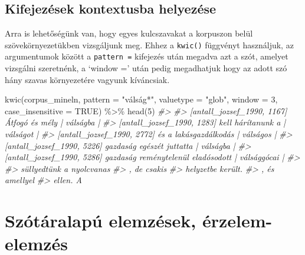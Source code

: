 \documentclass[
]{book}
\newenvironment{Shaded}{\begin{snugshade}}{\end{snugshade}}
\newcommand{\AttributeTok}[1]{\textcolor[rgb]{0.77,0.63,0.00}{#1}}
\newcommand{\CommentTok}[1]{\textcolor[rgb]{0.56,0.35,0.01}{\textit{#1}}}
\newcommand{\ConstantTok}[1]{\textcolor[rgb]{0.00,0.00,0.00}{#1}}
\newcommand{\DecValTok}[1]{\textcolor[rgb]{0.00,0.00,0.81}{#1}}
\newcommand{\FunctionTok}[1]{\textcolor[rgb]{0.00,0.00,0.00}{#1}}
\newcommand{\NormalTok}[1]{#1}
\newcommand{\SpecialCharTok}[1]{\textcolor[rgb]{0.00,0.00,0.00}{#1}}
\newcommand{\StringTok}[1]{\textcolor[rgb]{0.31,0.60,0.02}{#1}}
\begin{document}
\hypertarget{kifejezuxe9sek-kontextusba-helyezuxe9se}{%
\section{Kifejezések kontextusba
helyezése}\label{kifejezuxe9sek-kontextusba-helyezuxe9se}}

Arra is lehetőségünk van, hogy egyes kulcszavakat a korpuszon belül
szövekörnyezetükben vizsgáljunk meg. Ehhez a \texttt{kwic()} függvényt
használjuk, az argumentumok között a \texttt{pattern\ =} kifejezés után
megadva azt a szót, amelyet vizsgálni szeretnénk, a `window =' után
pedig megadhatjuk hogy az adott szó hány szavas környezetére vagyunk
kíváncsiak.

\begin{Shaded}
\begin{Highlighting}[]

\FunctionTok{kwic}\NormalTok{(corpus\_mineln, }\AttributeTok{pattern =} \StringTok{"válság*"}\NormalTok{, }\AttributeTok{valuetype =} \StringTok{"glob"}\NormalTok{, }\AttributeTok{window =} \DecValTok{3}\NormalTok{, }\AttributeTok{case\_insensitive =} \ConstantTok{TRUE}\NormalTok{) }\SpecialCharTok{\%\textgreater{}\%}
  \FunctionTok{head}\NormalTok{(}\DecValTok{5}\NormalTok{)}
\CommentTok{\#\textgreater{}                                                                               }
\CommentTok{\#\textgreater{}  [antall\_jozsef\_1990, 1167]                     Átfogó és mély |  válságba   |}
\CommentTok{\#\textgreater{}  [antall\_jozsef\_1990, 1283]                  kell hárítanunk a |  válságot   |}
\CommentTok{\#\textgreater{}  [antall\_jozsef\_1990, 2772]              és a lakásgazdálkodás |  válságos   |}
\CommentTok{\#\textgreater{}  [antall\_jozsef\_1990, 5226]          gazdaság egészét juttatta |  válságba   |}
\CommentTok{\#\textgreater{}  [antall\_jozsef\_1990, 5286] gazdaság reménytelenül eladósodott | válsággócai |}
\CommentTok{\#\textgreater{}                          }
\CommentTok{\#\textgreater{}  süllyedtünk a nyolcvanas}
\CommentTok{\#\textgreater{}  , de csakis             }
\CommentTok{\#\textgreater{}  helyzetbe került.       }
\CommentTok{\#\textgreater{}  , és amellyel           }
\CommentTok{\#\textgreater{}  ellen. A}
\end{Highlighting}
\end{Shaded}

\hypertarget{szuxf3tuxe1ralapuxfa-elemzuxe9sek-uxe9rzelem-elemzuxe9s}{%
\chapter{Szótáralapú elemzések,
érzelem-elemzés}\label{szuxf3tuxe1ralapuxfa-elemzuxe9sek-uxe9rzelem-elemzuxe9s}}
\end{document}
